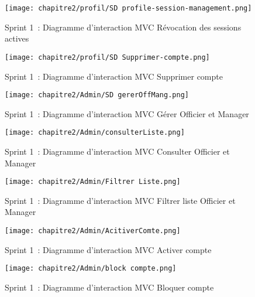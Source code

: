 \begin{figure}[H]
  \centering
  \texttt{[image: chapitre2/profil/SD profile-session-management.png]}
  \caption{Sprint 1~: Diagramme d'interaction MVC \og Révocation des sessions actives \fg{}}
  \label{fig:3.28}
\end{figure}

\begin{figure}[H]
  \centering
  \texttt{[image: chapitre2/profil/SD Supprimer-compte.png]}
  \caption{Sprint 1~: Diagramme d'interaction MVC \og Supprimer compte \fg{}}
  \label{fig:3.29}
\end{figure}

\begin{figure}[H]
  \centering
  \texttt{[image: chapitre2/Admin/SD gererOffMang.png]}
  \caption{Sprint 1~: Diagramme d'interaction MVC \og Gérer Officier et Manager \fg{}}
  \label{fig:3.14}
\end{figure}

\begin{figure}[H]
\centering
\texttt{[image: chapitre2/Admin/consulterListe.png]}
\caption{Sprint 1~: Diagramme d'interaction MVC \og Consulter Officier et Manager \fg{}}
\label{fig:3.15}
\end{figure}

\begin{figure}[H]
\centering
\texttt{[image: chapitre2/Admin/Filtrer Liste.png]}
\caption{Sprint 1~: Diagramme d'interaction MVC \og Filtrer liste Officier et Manager \fg{}}
\label{fig:3.16}
\end{figure}

\begin{figure}[H]
\centering
\texttt{[image: chapitre2/Admin/AcitiverComte.png]}
\caption{Sprint 1~: Diagramme d'interaction MVC \og Activer compte \fg{}}
\label{fig:3.17}
\end{figure}

\begin{figure}[H]
\centering
\texttt{[image: chapitre2/Admin/block compte.png]}
\caption{Sprint 1~: Diagramme d'interaction MVC \og Bloquer compte \fg{}}
\label{fig:3.18}
\end{figure}

